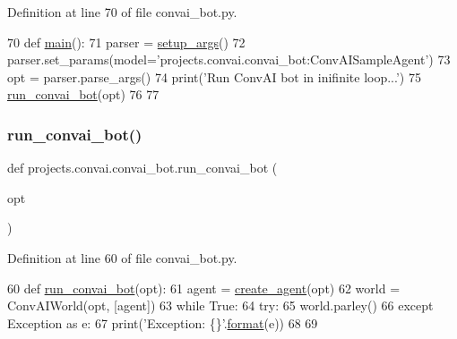 Definition at line 70 of file convai\+\_\+bot.\+py.


\begin{DoxyCode}
70 \textcolor{keyword}{def }\hyperlink{namespaceprojects_1_1convai_1_1convai__bot_a20f231e61b1255f9d9a5de5e77f063bf}{main}():
71     parser = \hyperlink{namespaceprojects_1_1convai_1_1convai__bot_abb3f83d4277a55c3f972f0f77d9066a7}{setup\_args}()
72     parser.set\_params(model=\textcolor{stringliteral}{'projects.convai.convai\_bot:ConvAISampleAgent'})
73     opt = parser.parse\_args()
74     print(\textcolor{stringliteral}{'Run ConvAI bot in inifinite loop...'})
75     \hyperlink{namespaceprojects_1_1convai_1_1convai__bot_a370a74521f78bc526eb9264aeb289f65}{run\_convai\_bot}(opt)
76 
77 
\end{DoxyCode}
\mbox{\label{namespaceprojects_1_1convai_1_1convai__bot_a370a74521f78bc526eb9264aeb289f65}} 
\subsubsection{\texorpdfstring{run\+\_\+convai\+\_\+bot()}{run\_convai\_bot()}}
{\footnotesize\ttfamily def projects.\+convai.\+convai\+\_\+bot.\+run\+\_\+convai\+\_\+bot (\begin{DoxyParamCaption}\item[{}]{opt }\end{DoxyParamCaption})}



Definition at line 60 of file convai\+\_\+bot.\+py.


\begin{DoxyCode}
60 \textcolor{keyword}{def }\hyperlink{namespaceprojects_1_1convai_1_1convai__bot_a370a74521f78bc526eb9264aeb289f65}{run\_convai\_bot}(opt):
61     agent = \hyperlink{namespaceparlai_1_1core_1_1agents_ad0d54074d4bcc148bb415ab5515a53b5}{create\_agent}(opt)
62     world = ConvAIWorld(opt, [agent])
63     \textcolor{keywordflow}{while} \textcolor{keyword}{True}:
64         \textcolor{keywordflow}{try}:
65             world.parley()
66         \textcolor{keywordflow}{except} Exception \textcolor{keyword}{as} e:
67             print(\textcolor{stringliteral}{'Exception: \{\}'}.\hyperlink{namespaceparlai_1_1chat__service_1_1services_1_1messenger_1_1shared__utils_a32e2e2022b824fbaf80c747160b52a76}{format}(e))
68 
69 
\end{DoxyCode}
\mbox{\label{namespaceprojects_1_1convai_1_1convai__bot_abb3f83d4277a55c3f972f0f77d9066a7}} 
